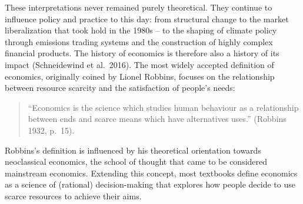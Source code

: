 \documentclass[
  a4paper,
  openany]{book}
\begin{document}
These interpretations never remained purely theoretical. They continue
to influence policy and practice to this day: from structural change to
the market liberalization that took hold in the 1980s -- to the shaping
of climate policy through emissions trading systems and the construction
of highly complex financial products. The history of economics is
therefore also a history of its impact (Schneidewind et al.~2016). The
most widely accepted definition of economics, originally coined by
Lionel Robbins, focuses on the relationship between resource scarcity
and the satisfaction of people's needs:

\begin{quote}
``Economics is the science which studies human behaviour as a
relationship between ends and scarce means which have alternatives
uses.'' (Robbins 1932, p.~15).
\end{quote}

Robbins's definition is influenced by his theoretical orientation
towards neoclassical economics, the school of thought that came to be
considered mainstream economics. Extending this concept, most textbooks
define economics as a science of (rational) decision-making that
explores how people decide to use scarce resources to achieve their
aims.
\end{document}
